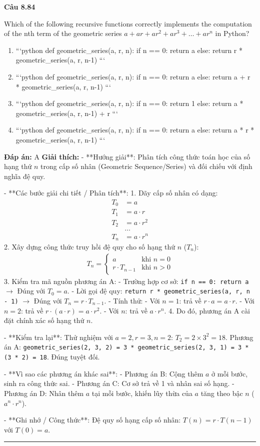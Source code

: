 \documentclass[11pt,a4paper]{article}
\newenvironment{question}[1]{%
  \par\vspace{1em}\noindent\textbf{\large Câu #1}\par\vspace{0.4em}
}{%
  \par\vspace{1em}\hrule\vspace{0.6em}
}
\newenvironment{choices}{%
  \begin{enumerate}[label=\textbf{\Alph*.},leftmargin=2.2em,itemsep=2pt,topsep=3pt]
}{%
  \end{enumerate}
}
\newcommand{\choice}{\item}
\begin{document}
\begin{question}{8.84}
Which of the following recursive functions correctly implements the computation of the nth term of the geometric series
\(a + ar + ar^2 + ar^3 + \dots + ar^n\)
in Python?
\begin{choices}
\choice 
```python
def geometric_series(a, r, n):
    if n == 0:
        return a
    else:
        return r * geometric_series(a, r, n-1)
```
\choice 
```python
def geometric_series(a, r, n):
    if n == 0:
        return a
    else:
        return a + r * geometric_series(a, r, n-1)
```
\choice 
```python
def geometric_series(a, r, n):
    if n == 0:
        return 1
    else:
        return a * geometric_series(a, r, n-1) + r
```
\choice 
```python
def geometric_series(a, r, n):
    if n == 0:
        return a
    else:
        return a * r * geometric_series(a, r, n-1)
```
\end{choices}
\textbf{Đáp án:} A
\textbf{Giải thích:} - **Hướng giải**:
Phân tích công thức toán học của số hạng thứ \(n\) trong cấp số nhân (Geometric Sequence/Series) và đối chiếu với định nghĩa đệ quy.


- **Các bước giải chi tiết / Phân tích**:
1. Dãy cấp số nhân có dạng:
   \[\begin{aligned}
   T_0 &= a \\
   T_1 &= a \cdot r \\
   T_2 &= a \cdot r^2 \\
   &\dots \\
   T_n &= a \cdot r^n
   \end{aligned}\]
2. Xây dựng công thức truy hồi đệ quy cho số hạng thứ \(n\) (\(T_n\)):
   \[\begin{aligned}
   T_n = \begin{cases}
   a & \text{khi } n = 0 \\
   r \cdot T_{n-1} & \text{khi } n > 0
   \end{cases}
   \end{aligned}\]
3. Kiểm tra mã nguồn phương án A:
   - Trường hợp cơ sở: \texttt{if n == 0: return a} \(\rightarrow\) Đúng với \(T_0 = a\).
   - Lời gọi đệ quy: \texttt{return r * geometric\_series(a, r, n - 1)} \(\rightarrow\) Đúng với \(T_n = r \cdot T_{n-1}\).
   - Tính thử:
     - Với \(n = 1\): trả về \(r \cdot a = a \cdot r\).
     - Với \(n = 2\): trả về \(r \cdot (a \cdot r) = a \cdot r^2\).
     - Với \(n\): trả về \(a \cdot r^n\).
4. Do đó, phương án A cài đặt chính xác số hạng thứ \(n\).


- **Kiểm tra lại**:
Thử nghiệm với \(a = 2, r = 3, n = 2\):
\(T_2 = 2 \times 3^2 = 18\).
Phương án A:
\texttt{geometric\_series(2, 3, 2) = 3 * geometric\_series(2, 3, 1) = 3 * (3 * 2) = 18}. Đúng tuyệt đối.


- **Vì sao các phương án khác sai**:
- Phương án B: Cộng thêm \(a\) ở mỗi bước, sinh ra công thức sai.
- Phương án C: Cơ sở trả về 1 và nhân sai số hạng.
- Phương án D: Nhân thêm \(a\) tại mỗi bước, khiến lũy thừa của \(a\) tăng theo bậc \(n\) (\(a^n \cdot r^n\)).


- **Ghi nhớ / Công thức**:
Đệ quy số hạng cấp số nhân: \(T(n) = r \cdot T(n-1)\) với \(T(0) = a\).
\end{question}
\end{document}
